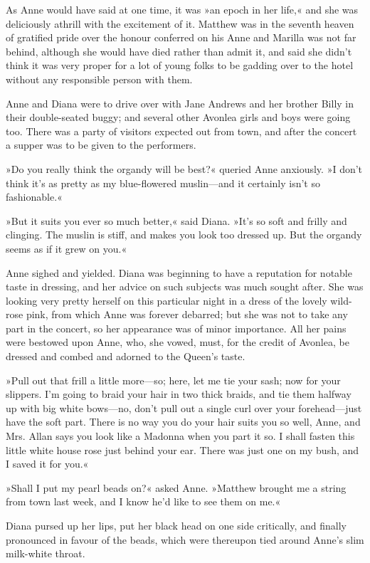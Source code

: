 As Anne would have said at one time, it was »an epoch in her life,« and she was deliciously athrill with the excitement of it. Matthew was in the seventh heaven of gratified pride over the honour conferred on his Anne and Marilla was not far behind, although she would have died rather than admit it, and said she didn’t think it was very proper for a lot of young folks to be gadding over to the hotel without any responsible person with them.

Anne and Diana were to drive over with Jane Andrews and her brother Billy in their double-seated buggy; and several other Avonlea girls and boys were going too. There was a party of visitors expected out from town, and after the concert a supper was to be given to the performers.

»Do you really think the organdy will be best?« queried Anne anxiously. »I don’t think it’s as pretty as my blue-flowered muslin—and it certainly isn’t so fashionable.«

»But it suits you ever so much better,« said Diana. »It’s so soft and frilly and clinging. The muslin is stiff, and makes you look too dressed up. But the organdy seems as if it grew on you.«

Anne sighed and yielded. Diana was beginning to have a reputation for notable taste in dressing, and her advice on such subjects was much sought after. She was looking very pretty herself on this particular night in a dress of the lovely wild-rose pink, from which Anne was forever debarred; but she was not to take any part in the concert, so her appearance was of minor importance. All her pains were bestowed upon Anne, who, she vowed, must, for the credit of Avonlea, be dressed and combed and adorned to the Queen’s taste.

»Pull out that frill a little more—so; here, let me tie your sash; now for your slippers. I’m going to braid your hair in two thick braids, and tie them halfway up with big white bows—no, don’t pull out a single curl over your forehead—just have the soft part. There is no way you do your hair suits you so well, Anne, and Mrs. Allan says you look like a Madonna when you part it so. I shall fasten this little white house rose just behind your ear. There was just one on my bush, and I saved it for you.«

»Shall I put my pearl beads on?« asked Anne. »Matthew brought me a string from town last week, and I know he’d like to see them on me.«

Diana pursed up her lips, put her black head on one side critically, and finally pronounced in favour of the beads, which were thereupon tied around Anne’s slim milk-white throat.

